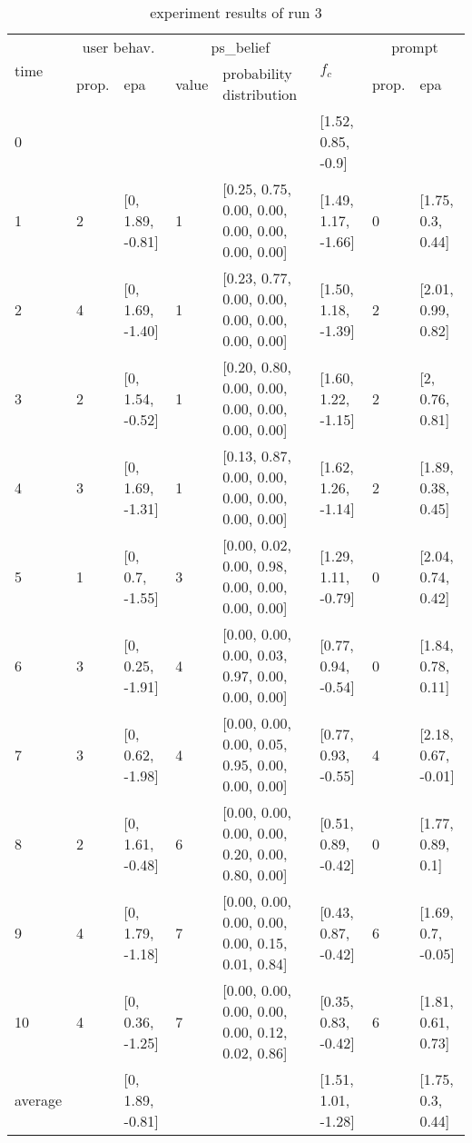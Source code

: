 \begin{table}[htbp]\footnotesize
\caption{experiment results of run 3}
\begin{tabular}{|p{0.4cm}|p{0.6cm}|l|p{0.6cm}|p{3.3cm}|l|p{0.6cm}|l|}
\hline

\multirow{2}{*}{time} & \multicolumn{2}{c|}{user behav.} & \multicolumn{2}{c|}{ps\_belief} &
\multirow{2}{*}{$f_c$} & \multicolumn{2}{c|}{prompt} \\ \cline{2-5}\cline{ 7- 8}
& prop. & epa & value & probability distribution &  & prop. & epa \\ \hline

0 & \multicolumn{1}{l|}{} &  & \multicolumn{1}{l|}{} &  & [1.52, 0.85, -0.9] & \multicolumn{1}{l|}{} &  \\ \hline
1 & 2 & [0, 1.89, -0.81] & 1 & [0.25, 0.75, 0.00, 0.00, 0.00, 0.00, 0.00, 0.00] & [1.49, 1.17, -1.66] & 0 & [1.75, 0.3, 0.44] \\ \hline
2 & 4 & [0, 1.69, -1.40] & 1 & [0.23, 0.77, 0.00, 0.00, 0.00, 0.00, 0.00, 0.00] & [1.50, 1.18, -1.39] & 2 & [2.01, 0.99, 0.82] \\ \hline
3 & 2 & [0, 1.54, -0.52] & 1 & [0.20, 0.80, 0.00, 0.00, 0.00, 0.00, 0.00, 0.00] & [1.60, 1.22, -1.15] & 2 & [2, 0.76, 0.81] \\ \hline
4 & 3 & [0, 1.69, -1.31] & 1 & [0.13, 0.87, 0.00, 0.00, 0.00, 0.00, 0.00, 0.00] & [1.62, 1.26, -1.14] & 2 & [1.89, 0.38, 0.45] \\ \hline
5 & 1 & [0, 0.7, -1.55] & 3 & [0.00, 0.02, 0.00, 0.98, 0.00, 0.00, 0.00, 0.00] & [1.29, 1.11, -0.79] & 0 & [2.04, 0.74, 0.42] \\ \hline
6 & 3 & [0, 0.25, -1.91] & 4 & [0.00, 0.00, 0.00, 0.03, 0.97, 0.00, 0.00, 0.00] & [0.77, 0.94, -0.54] & 0 & [1.84, 0.78, 0.11] \\ \hline
7 & 3 & [0, 0.62, -1.98] & 4 & [0.00, 0.00, 0.00, 0.05, 0.95, 0.00, 0.00, 0.00] & [0.77, 0.93, -0.55] & 4 & [2.18, 0.67, -0.01] \\ \hline
8 & 2 & [0, 1.61, -0.48] & 6 & [0.00, 0.00, 0.00, 0.00, 0.20, 0.00, 0.80, 0.00] & [0.51, 0.89, -0.42] & 0 & [1.77, 0.89, 0.1] \\ \hline
9 & 4 & [0, 1.79, -1.18] & 7 & [0.00, 0.00, 0.00, 0.00, 0.00, 0.15, 0.01, 0.84] & [0.43, 0.87, -0.42] & 6 & [1.69, 0.7, -0.05] \\ \hline
10 & 4 & [0, 0.36, -1.25] & 7 & [0.00, 0.00, 0.00, 0.00, 0.00, 0.12, 0.02, 0.86] & [0.35, 0.83, -0.42] & 6 & [1.81, 0.61, 0.73] \\ \hline
\multicolumn{1}{|l|}{average} & \multicolumn{1}{l|}{} & [0, 1.89, -0.81] & \multicolumn{1}{l|}{} &  & [1.51, 1.01, -1.28] & \multicolumn{1}{l|}{} & [1.75, 0.3, 0.44] \\ \hline
\end{tabular}
\label{}
\end{table}



